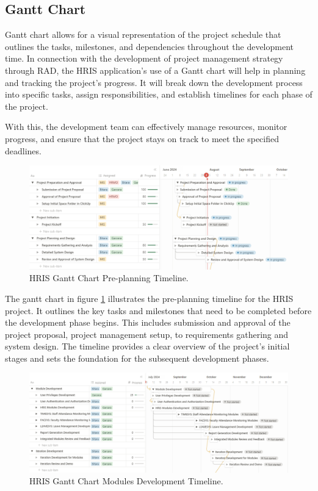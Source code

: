     \subsection{Gantt Chart}
    
    Gantt chart allows for a visual representation of the project schedule that outlines the tasks, milestones, and dependencies throughout the development time. In connection with the development of project management strategy through RAD, the HRIS application's use of a Gantt chart will help in planning and tracking the project's progress. It will break down the development process into specific tasks, assign responsibilities, and establish timelines for each phase of the project.
    
    With this, the development team can effectively manage resources, monitor progress, and ensure that the project stays on track to meet the specified deadlines.

    \begin{figure}[H]
        \centering
        \includegraphics[width=1\linewidth]{figures/images/gantt-chart-1.png}
        \caption{HRIS Gantt Chart Pre-planning Timeline.}
        \label{fig:gantt-chart-1}
    \end{figure}

    The gantt chart in figure \ref{fig:gantt-chart-1} illustrates the pre-planning timeline for the HRIS project. It outlines the key tasks and milestones that need to be completed before the development phase begins. This includes submission and approval of the project proposal, project management setup, to requirements gathering and system design. The timeline provides a clear overview of the project's initial stages and sets the foundation for the subsequent development phases.

    \begin{figure}[H]
        \centering
        \includegraphics[width=1\linewidth]{figures/images/gantt-chart-2.png}
        \caption{HRIS Gantt Chart Modules Development Timeline.}
        \label{fig:gantt-chart-2}
    \end{figure}

